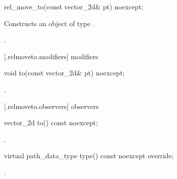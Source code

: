 \begin{itemdecl}
    rel_move_to(const vector_2d& pt) noexcept;
\end{itemdecl}
\begin{itemdescr}
	\pnum
	\effects
	Constructs an object of type .
	
	\pnum
	\postconditions
	.
\end{itemdescr}

 [\iotwod.relmoveto.modifiers]{ modifiers}

\begin{itemdecl}
    void to(const vector_2d& pt) noexcept;
\end{itemdecl}
\begin{itemdescr}
	\pnum
	\postconditions
	.
	
\end{itemdescr}

 [\iotwod.relmoveto.observers]{ observers}

\begin{itemdecl}
    vector_2d to() const noexcept;
\end{itemdecl}
\begin{itemdescr}
	\pnum
	\returns
	.

\end{itemdescr}

\begin{itemdecl}
    virtual path_data_type type() const noexcept override;
\end{itemdecl}
\begin{itemdescr}
	\pnum
	\returns
	.

\end{itemdescr}
